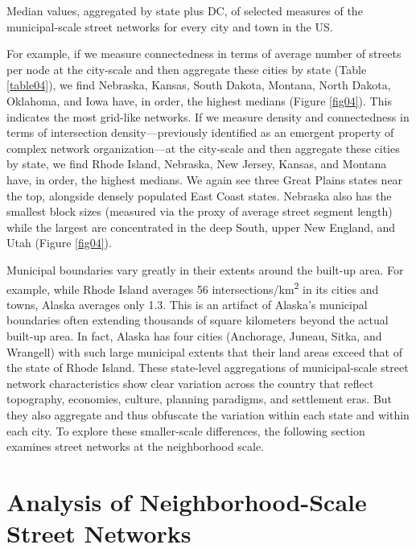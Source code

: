 \documentclass[Afour,sageh,times]{sage/sagej}
\begin{document}
\begin{table}[h]
\caption{Median values, aggregated by state plus DC, of selected measures of the municipal-scale street networks for every city and town in the US.}
\label{table04}
\end{table}

For example, if we measure connectedness in terms of average number of streets per node at the city-scale and then aggregate these cities by state (Table \ref{table04}), we find Nebraska, Kansas, South Dakota, Montana, North Dakota, Oklahoma, and Iowa have, in order, the highest medians (Figure \ref{fig04}). This indicates the most grid-like networks. If we measure density and connectedness in terms of intersection density---previously identified as an emergent property of complex network organization---at the city-scale and then aggregate these cities by state, we find Rhode Island, Nebraska, New Jersey, Kansas, and Montana have, in order, the highest medians. We again see three Great Plains states near the top, alongside densely populated East Coast states. Nebraska also has the smallest block sizes (measured via the proxy of average street segment length) while the largest are concentrated in the deep South, upper New England, and Utah (Figure \ref{fig04}).

Municipal boundaries vary greatly in their extents around the built-up area. For example, while Rhode Island averages 56 intersections/km\textsuperscript{2} in its cities and towns, Alaska averages only 1.3. This is an artifact of Alaska's municipal boundaries often extending thousands of square kilometers beyond the actual built-up area. In fact, Alaska has four cities (Anchorage, Juneau, Sitka, and Wrangell) with such large municipal extents that their land areas exceed that of the state of Rhode Island. These state-level aggregations of municipal-scale street network characteristics show clear variation across the country that reflect topography, economies, culture, planning paradigms, and settlement eras. But they also aggregate and thus obfuscate the variation within each state and within each city. To explore these smaller-scale differences, the following section examines street networks at the neighborhood scale.

\section{Analysis of Neighborhood-Scale Street Networks}
\end{document}
